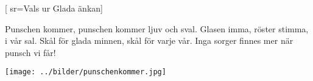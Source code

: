 

[				%
	sr={Vals ur Glada änkan}]						%
	

\beginverse*						%
Punschen kommer,
punschen kommer
ljuv och sval.
Glasen imma,
röster stimma,
i vår sal.
Skål för glada minnen,
skål för varje vår.
Inga sorger finnes mer när punsch vi får!
\endverse							%

\endsong							%

\begin{intersong}
\begin{center}
\texttt{[image: ../bilder/punschenkommer.jpg]} 
\end{center}
\end{intersong}